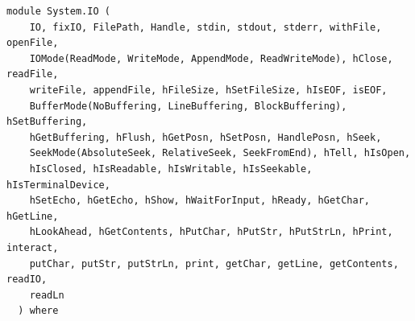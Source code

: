 \label{module:System.IO}
\haddockbeginheader
{\haddockverb\begin{verbatim}
module System.IO (
    IO, fixIO, FilePath, Handle, stdin, stdout, stderr, withFile, openFile,
    IOMode(ReadMode, WriteMode, AppendMode, ReadWriteMode), hClose, readFile,
    writeFile, appendFile, hFileSize, hSetFileSize, hIsEOF, isEOF,
    BufferMode(NoBuffering, LineBuffering, BlockBuffering), hSetBuffering,
    hGetBuffering, hFlush, hGetPosn, hSetPosn, HandlePosn, hSeek,
    SeekMode(AbsoluteSeek, RelativeSeek, SeekFromEnd), hTell, hIsOpen,
    hIsClosed, hIsReadable, hIsWritable, hIsSeekable, hIsTerminalDevice,
    hSetEcho, hGetEcho, hShow, hWaitForInput, hReady, hGetChar, hGetLine,
    hLookAhead, hGetContents, hPutChar, hPutStr, hPutStrLn, hPrint, interact,
    putChar, putStr, putStrLn, print, getChar, getLine, getContents, readIO,
    readLn
  ) where\end{verbatim}}
\haddockendheader

